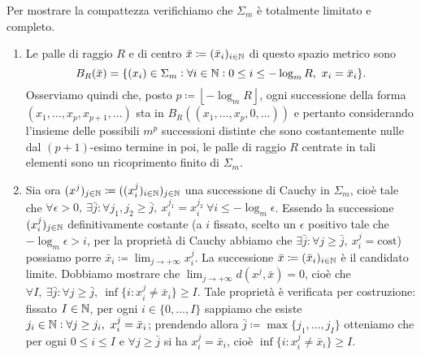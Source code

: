 Per mostrare la compattezza verifichiamo che $ \Sigma_m $ è totalmente limitato e completo.
\begin{enumerate}
    \item Le palle di raggio $ R $ e di centro $ \bar{x} \coloneqq (\bar{x}_i)_{i \in \mathbb{N}} $ di questo spazio metrico sono
    \[
    B_R(\bar{x}) = \{(x_i) \in \Sigma_m : \forall i \in \mathbb{N} : 0 \leq i \leq -\log_m{R}, \ x_i = \bar{x}_i\}.
    \]
    Osserviamo quindi che, posto $ p \coloneqq \left \lfloor -\log_m{R} \right \rfloor $, ogni successione della forma \linebreak $ (x_1, \ldots, x_p, x_{p+1}, \ldots) $ sta in $ B_R{\left((x_1, \ldots, x_p, 0, \ldots)\right)} $ e pertanto considerando l'insieme delle possibili $ m^p $ successioni distinte che sono costantemente nulle dal $ (p+1) $-esimo termine in poi, le palle di raggio $ R $ centrate in tali elementi sono un ricoprimento finito di $ \Sigma_m $.
    \item Sia ora $ (x^j)_{j \in \mathbb{N}} \coloneqq ((x_i^j)_{i \in \mathbb{N}})_{j \in \mathbb{N}} $ una successione di Cauchy in $ \Sigma_m $, cioè tale che $ \forall \epsilon > 0, \ \exists \bar{j} : \forall j_1, j_2 \geq \bar{j}, \ x_i^{j_1} = x_i^{j_2} \ \forall i \leq -\log_m{\epsilon} $. Essendo la successione $ (x_i^j)_{j \in \mathbb{N}} $ definitivamente costante (a $ i $ fissato, scelto un $ \epsilon $ positivo tale che $ -\log_m{\epsilon} > i $, per la proprietà di Cauchy abbiamo che $ \exists \bar{j} : \forall j \geq \bar{j}, \ x_i^j = \text{cost} $) possiamo porre $ \bar{x}_i \coloneqq \lim_{j \to +\infty} x_i^j $. La successione $ \bar{x} \coloneqq (\bar{x}_i)_{i \in \mathbb{N}} $ è il candidato limite. Dobbiamo mostrare che $ \lim_{j \to +\infty} d(x^j, \bar{x}) = 0 $, cioè che $ \forall I, \ \exists \bar{j} : \forall j \geq \bar{j}, \ \inf{\{i : x_i^j \neq \bar{x}_i\}} \geq I $. Tale proprietà è verificata per costruzione: fissato $ I \in \mathbb{N} $, per ogni $ i \in \{0, \ldots, I\} $ sappiamo che esiste $ j_i \in \mathbb{N} : \forall j \geq j_i, \ x_i^j = \bar{x}_i $; prendendo allora $ \bar{j} \coloneqq \max \{j_1, \ldots, j_I\} $ otteniamo che per ogni $ 0 \leq i \leq I $ e $ \forall j \geq \bar{j} $ si ha $ x_i^j = \bar{x}_i $, cioè $ \inf{\{i : x_i^j \neq \bar{x}_i\}} \geq I $.
\end{enumerate}

